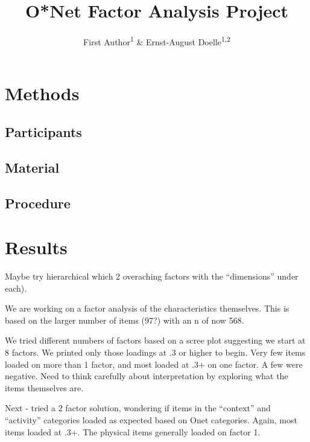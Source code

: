 \documentclass[
  english,
  man]{apa6}
\title{O*Net Factor Analysis Project}
\author{First Author\textsuperscript{1} \& Ernst-August Doelle\textsuperscript{1,2}}
\date{}
\affiliation{\vspace{0.5cm}\textsuperscript{1} Wilhelm-Wundt-University\\\textsuperscript{2} Konstanz Business School}
\begin{document}
\maketitle

\hypertarget{methods}{%
\section{Methods}\label{methods}}

\hypertarget{participants}{%
\subsection{Participants}\label{participants}}

\hypertarget{material}{%
\subsection{Material}\label{material}}

\hypertarget{procedure}{%
\subsection{Procedure}\label{procedure}}

\hypertarget{results}{%
\section{Results}\label{results}}

Maybe try hierarchical which 2 overaching factors with the ``dimensions'' under each).

We are working on a factor analysis of the characteristics themselves. This is based on the larger number of items (97?) with an n of now 568.

We tried different numbers of factors based on a scree plot suggesting we start at 8 factors. We printed only those loadings at .3 or higher to begin. Very few items loaded on more than 1 factor, and most loaded at .3+ on one factor. A few were negative. Need to think carefully about interpretation by exploring what the items themselves are.

Next - tried a 2 factor solution, wondering if items in the ``context'' and ``activity'' categories loaded as expected based on Onet categories. Again, most items loaded at .3+. The physical items generally loaded on factor 1.
\end{document}
